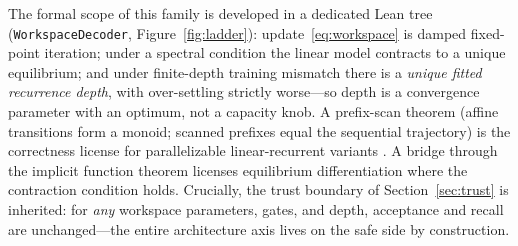 \documentclass[11pt]{article}
\newcommand{\code}[1]{\texttt{#1}}
\begin{document}
The formal scope of this family is developed in a dedicated Lean tree
(\code{WorkspaceDecoder}, Figure~\ref{fig:ladder}): update~\eqref{eq:workspace} is damped
fixed-point iteration;
under a spectral condition the linear model contracts to a unique equilibrium; and under
finite-depth training mismatch there is a \emph{unique fitted recurrence depth}, with
over-settling strictly worse---so depth is a convergence parameter with an optimum, not
a capacity knob. A prefix-scan theorem (affine transitions form a monoid; scanned
prefixes equal the sequential trajectory) is the correctness license for
parallelizable linear-recurrent variants \cite{gu2023mamba}. A bridge through the
implicit function theorem licenses equilibrium differentiation \cite{bai2019deq} where
the contraction condition holds. Crucially, the trust boundary of
Section~\ref{sec:trust} is inherited: for \emph{any} workspace parameters, gates, and
depth, acceptance and recall are unchanged---the entire architecture axis lives on the
safe side by construction.
\end{document}
